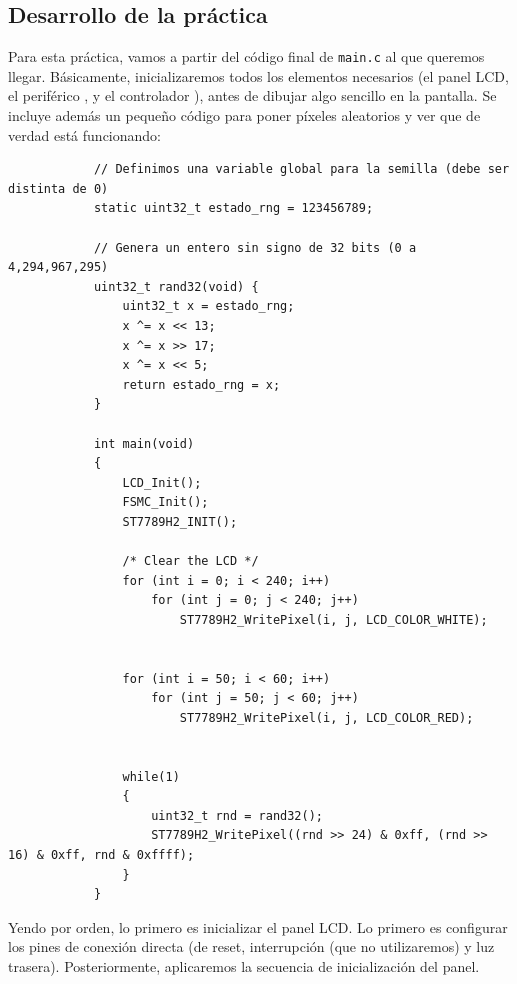 \documentclass[../main.tex]{subfiles}
\begin{document}
    \subsection{Desarrollo de la práctica}

        Para esta práctica, vamos a partir del código final de \texttt{main.c} al que queremos llegar. Básicamente, inicializaremos todos los elementos necesarios (el panel LCD, el periférico , y el controlador \LCDMAN[]), antes de dibujar algo sencillo en la pantalla. Se incluye además un pequeño código para poner píxeles aleatorios y ver que de verdad está funcionando:

        \begin{lstlisting}
            // Definimos una variable global para la semilla (debe ser distinta de 0)
            static uint32_t estado_rng = 123456789;

            // Genera un entero sin signo de 32 bits (0 a 4,294,967,295)
            uint32_t rand32(void) {
                uint32_t x = estado_rng;
                x ^= x << 13;
                x ^= x >> 17;
                x ^= x << 5;
                return estado_rng = x;
            }

            int main(void)
            {
                LCD_Init();
                FSMC_Init();
                ST7789H2_INIT();

                /* Clear the LCD */
                for (int i = 0; i < 240; i++)
                    for (int j = 0; j < 240; j++)
                        ST7789H2_WritePixel(i, j, LCD_COLOR_WHITE);


                for (int i = 50; i < 60; i++)
                    for (int j = 50; j < 60; j++)
                        ST7789H2_WritePixel(i, j, LCD_COLOR_RED);


                while(1)
                {
                    uint32_t rnd = rand32();
                    ST7789H2_WritePixel((rnd >> 24) & 0xff, (rnd >> 16) & 0xff, rnd & 0xffff);
                }
            }
        \end{lstlisting}

        Yendo por orden, lo primero es inicializar el panel LCD. Lo primero es configurar los pines de conexión directa (de reset, interrupción (que no utilizaremos) y luz trasera). Posteriormente, aplicaremos la secuencia de inicialización del panel.
\end{document}
